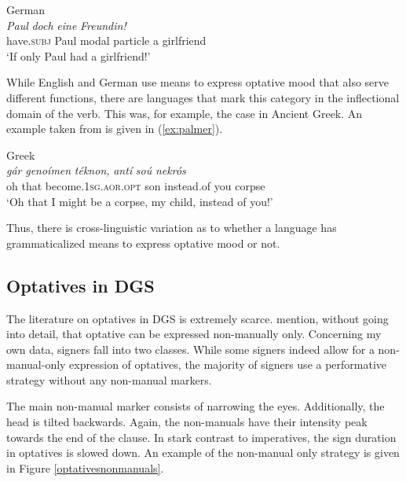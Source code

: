\begin{exe}
\ex German \\  {\textit{Paul}} {\textit{doch}} {\textit{eine}} {\textit{Freundin!}}   \\
{have.\textsc{subj}} {Paul} {modal particle} {a} {girlfriend}\\
\trans `If only Paul had a girlfriend!' \label{ex:optativegermansubjunctive}
\end{exe}

\noindent While English and German use means to express optative mood that also serve different functions, there are languages that mark this category in the inflectional domain of the verb. This was, for example, the case in Ancient Greek. An example taken from \citet[216]{palmer2001mood} is given in (\ref{ex:palmer}).

\begin{exe}
\ex Greek \citep[216]{palmer2001mood} \\  {\textit{gár}} {\textit{genoíme\textlengthmark n}} {\textit{téknon,}} {\textit{antí}} {\textit{soú}} {\textit{nekrós}}          \\
{oh} {that} {become.1\textsc{sg.aor.opt}} {son} {instead.of} {you} {corpse}  \\
\trans `Oh that I might be a corpse, my child, instead of you!' \label{ex:palmer}
\end{exe}

\noindent Thus, there is cross-linguistic variation as to whether a language has grammaticalized means to express optative mood or not.

\subsection{Optatives in DGS}
The literature on optatives in DGS is extremely scarce. \citet[366]{happ2014vork} mention, without going into detail, that optative can be expressed non-manually only. Concerning my own data, signers fall into two classes. While some signers indeed allow for a non-manual-only expression of optatives, the majority of signers use a performative strategy without any non-manual markers.


The main non-manual marker consists of narrowing the eyes. Additionally, the head is tilted backwards. Again, the non-manuals have their intensity peak towards the end of the clause. In stark contrast to imperatives, the sign duration in optatives is slowed down.  An example of the non-manual only strategy is given in Figure \ref{optativesnonmanuals}.  

